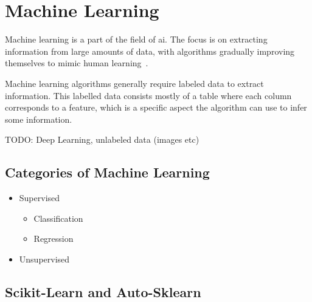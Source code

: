 \section{Machine Learning}
Machine learning is a part of the field of \ac{ai}. The focus is on extracting information from large amounts of data, with algorithms gradually improving themselves to mimic human learning~\cite{what-is-ml}.

Machine learning algorithms generally require labeled data to extract information. This labelled data consists mostly of a table where each column corresponds to a feature, which is a specific aspect the algorithm can use to infer some information. %

TODO: Deep Learning, unlabeled data (images etc)
\subsection{Categories of Machine Learning}
\begin{itemize}
  \item Supervised
        \begin{itemize}
          \item Classification
          \item Regression
        \end{itemize}
  \item Unsupervised
\end{itemize}

\subsection{Scikit-Learn and Auto-Sklearn}
